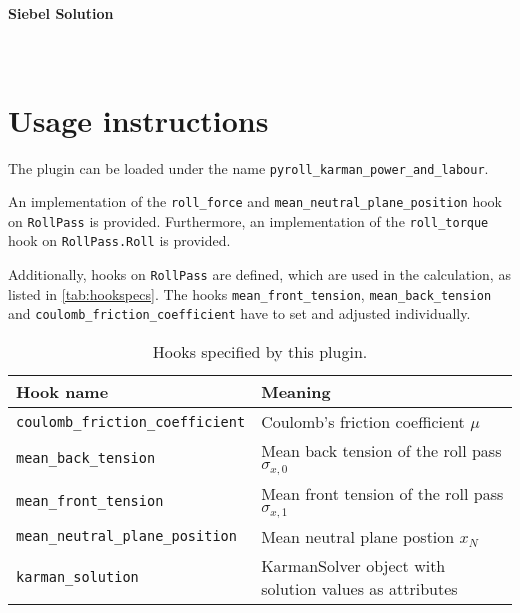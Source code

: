 \documentclass[11pt]{PyRollDocs}
\begin{document}
    \paragraph{Siebel Solution}\\

    \section{Usage instructions}\label{sec:usage-instructions}
    The plugin can be loaded under the name \texttt{pyroll\_karman\_power\_and\_labour}.

    An implementation of the \lstinline{roll_force} and \lstinline{mean_neutral_plane_position} hook on \lstinline{RollPass} is provided.
    Furthermore, an implementation of the \lstinline{roll_torque} hook on \lstinline{RollPass.Roll} is provided.

    Additionally, hooks on \lstinline{RollPass} are defined, which are used in the calculation, as listed in \autoref{tab:hookspecs}.
    The hooks \lstinline{mean_front_tension}, \lstinline{mean_back_tension} and \lstinline{coulomb_friction_coefficient} have to set and adjusted individually.

    \begin{table}
        \centering
        \caption{Hooks specified by this plugin.}
        \label{tab:hookspecs}
        \begin{tabular}{ll}
            \toprule
            Hook name                               & Meaning                                                \\
            \midrule
            \texttt{coulomb\_friction\_coefficient} & Coulomb's friction coefficient $\mu$                   \\
            \texttt{mean\_back\_tension}            & Mean back tension of the roll pass $\sigma_{x,0}$      \\
            \texttt{mean\_front\_tension}           & Mean front tension of the roll pass $\sigma_{x,1}$     \\
            \texttt{mean\_neutral\_plane\_position} & Mean neutral plane postion $x_N$                       \\
            \texttt{karman\_solution}               & KarmanSolver object with solution values as attributes \\
            \bottomrule
        \end{tabular}
    \end{table}

    \printbibliography
\end{document}
